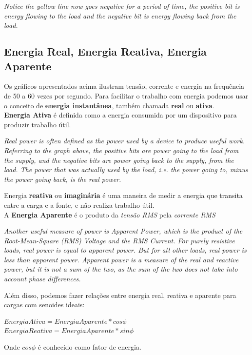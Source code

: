 \documentclass[a4paper, 12pt]{article}
\begin{document}
\begin{flushright}
	\textit{Notice the yellow line now goes negative for a period of time, the positive bit is energy flowing to the load and the negative bit is energy flowing back from the load.}
\end{flushright}

\subsection{Energia Real, Energia Reativa, Energia Aparente}
Os gráficos apresentados acima ilustram tensão, corrente e energia na frequência de 50 a 60 vezes por segundo. Para facilitar o trabalho com energia podemos usar o conceito de \textbf{energia instantânea}, também chamada \textbf{real} ou \textbf{ativa}.\\

\textbf{Energia Ativa} é definida como a energia consumida por um dispositivo para produzir trabalho útil.

\begin{flushright}
	\textit{Real power is often defined as the power used by a device to produce useful work. Referring to the graph above, the positive bits are power going to the load from the supply, and the negative bits are power going back to the supply, from the load. The power that was actually used by the load, i.e. the power going to, minus the power going back, is the real power.}
\end{flushright}

Energia \textbf{reativa} ou \textbf{imaginária} é uma maneira de medir a energia que transita entre a carga e a fonte, e não realiza trabalho útil.\\

A \textbf{Energia Aparente} é o produto da \textit{tensão RMS} pela \textit{corrente RMS}

\begin{flushright}
	\textit{Another useful measure of power is Apparent Power, which is the product of the Root-Mean-Square (RMS) Voltage and the RMS Current. For purely resistive loads, real power is equal to apparent power. But for all other loads, real power is less than apparent power. Apparent power is a measure of the real and reactive power, but it is not a sum of the two, as the sum of the two does not take into account phase differences.}
\end{flushright}

Além disso, podemos fazer relações entre energia real, reativa e aparente para cargas com senoides ideais:
	\begin{center}
		$
		EnergiaAtiva = EnergiaAparente*cos \phi
		$\\
		$
		EnergiaReativa = EnergiaAparente*sin \phi
		$\\
	\end{center}
Onde $cos \phi$ é conhecido como fator de energia.
\end{document}
